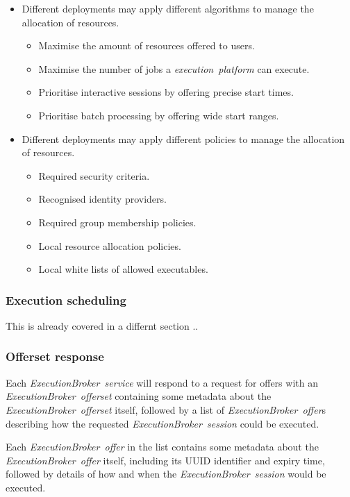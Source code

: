 \documentclass[11pt,a4paper]{ivoa}
\newcommand{\execbrokerservice}[1] {\textit{ExecutionBroker~service#1}}
\newcommand{\execoffer}[1] {\textit{ExecutionBroker~offer#1}}
\newcommand{\execofferset}[1] {\textit{ExecutionBroker~offerset#1}}
\newcommand{\execsession}[1] {\textit{ExecutionBroker~session#1}}
\newcommand{\execplatform} {\textit{execution~platform}}
\begin{document}
\begin{itemize}
    \item Different deployments may apply different algorithms to manage the allocation of resources.
    \begin{itemize}
        \item Maximise the amount of resources offered to users.
        \item Maximise the number of jobs a \execplatform{} can execute.
        \item Prioritise interactive sessions by offering precise start times.
        \item Prioritise batch processing by offering wide start ranges.
    \end{itemize}

    \item Different deployments may apply different policies to manage the allocation of resources.
    \begin{itemize}
        \item Required security criteria.
        \item Recognised identity providers.
        \item Required group membership policies.
        \item Local resource allocation policies.
        \item Local white lists of allowed executables.
    \end{itemize}
\end{itemize}

\subsubsection{Execution scheduling}
\label{subsub-execution-scheduling}

This is already covered in a differnt section ..

\subsubsection{Offerset response}
\label{subsub-offerset-response}

Each \execbrokerservice{} will respond to a request for offers with an \execofferset{}
containing some metadata about the \execofferset{} itself, followed by a list of \execoffer{}s
describing how the requested \execsession{} could be executed.

Each \execoffer{} in the list contains some metadata about the \execoffer{} itself,
including its UUID identifier and expiry time, followed by details of how and when the
\execsession{} would be executed.
\end{document}
